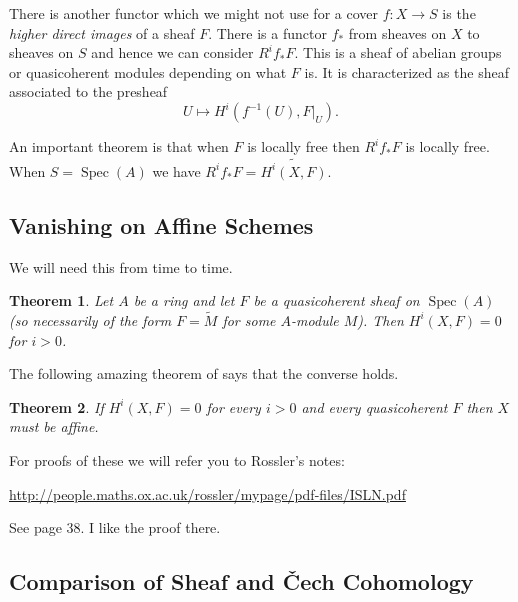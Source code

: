 \documentclass[12pt]{article}
\numberwithin{equation}{section}
\newtheorem{theorem}{Theorem}[subsection]
\theoremstyle{definition}
\theoremstyle{remark}
\newcommand{\Spec}{\operatorname{Spec}}
\begin{document}
There is another functor which we might not use for a cover $f:X\to S$ is the \emph{higher direct images} of a sheaf $F$. 
There is a functor $f_*$ from sheaves on $X$ to sheaves on $S$ and hence we can consider $R^if_*F$. 
This is a sheaf of abelian groups or quasicoherent modules depending on what $F$ is. 
It is characterized as the sheaf associated to the presheaf 
 $$ U \mapsto H^i(f^{-1}(U),F\vert_U). $$

An important theorem is that when $F$ is locally free then $R^if_*F$ is locally free. 
When $S=\Spec(A)$ we have $R^if_*F = \widetilde{H^i(X,F)}$.

\subsection{Vanishing on Affine Schemes}
We will need this from time to time. 
\begin{theorem}
	Let $A$ be a ring and let $F$ be a quasicoherent sheaf on $\Spec(A)$ (so necessarily of the form $F=\widetilde{M}$ for some $A$-module $M$).
	Then $H^i(X,F)= 0$ for $i>0$.
\end{theorem}

The following amazing theorem of says that the converse holds.  
\begin{theorem}
	 If $H^i(X,F)=0$ for every $i>0$ and every quasicoherent $F$ then $X$ must be affine. 
\end{theorem}

For proofs of these we will refer you to Rossler's notes:
\begin{center}
\url{http://people.maths.ox.ac.uk/rossler/mypage/pdf-files/ISLN.pdf}
\end{center}
See page 38. I like the proof there. 

\subsection{Comparison of Sheaf and \v{C}ech Cohomology}
\end{document}
